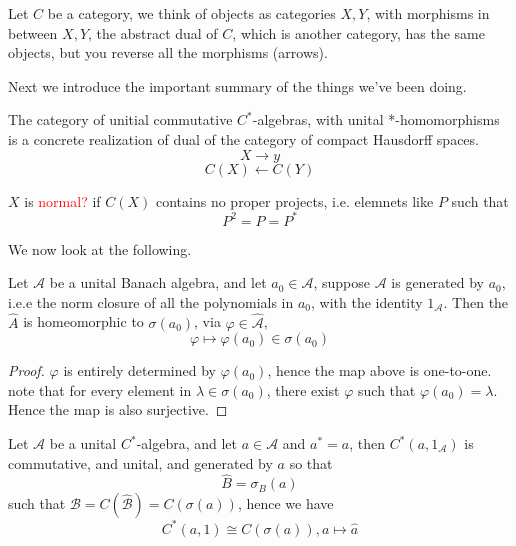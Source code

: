 \begin{definition}
    Let $C$ be a category, we think of objects as categories $X,Y$, with morphisms in between $X,Y$, the abstract dual  of $C$, which is another category, has the same objects, but you reverse all the morphisms (arrows).
\end{definition}
Next we introduce the important summary of the things we've been doing.

\begin{theorem}
    The category of unitial commutative $C^*$-algebras, with unital *-homomorphisms is a concrete realization of dual of the category of compact Hausdorff spaces.
    \begin{equation*}
        X\rightarrow y
    \end{equation*}
    \begin{equation*}
        C(X)\leftarrow C(Y)
    \end{equation*}
\end{theorem}

$X$ is \textcolor{red}{normal?} if $C(X)$ contains no proper projects, i.e. elemnets like $P$ such that
\begin{equation*}
    P^2=P=P^*
\end{equation*}

We now look at the following.
\begin{proposition}
    Let $\mathcal{A}$ be a unital Banach algebra, and let $a_0\in\mathcal{A}$, suppose $\mathcal{A}$ is generated by $a_0$, i.e.e the norm closure of all the polynomials in $a_0$, with the identity $1_\mathcal{A}$. Then the $\widehat{A}$ is homeomorphic to $\sigma(a_0)$, via $\varphi\in\widehat{\mathcal{A}}$, 
    \begin{equation*}
        \varphi\mapsto \varphi(a_0)\in\sigma(a_0)
    \end{equation*}
\end{proposition}
\begin{proof}
    $\varphi$ is entirely determined by $\varphi(a_0)$, hence the map above is one-to-one. note that for every element in $\lambda\in\sigma(a_0)$, there exist $\varphi$ such that $\varphi(a_0)=\lambda$. Hence the map is also surjective.
\end{proof}

Let $\mathcal{A}$ be a unital $C^*$-algebra, and let $a\in\mathcal{A}$ and $a^*=a$, then $C^*(a,1_\mathcal{A})$ is commutative, and unital, and generated by $a$ so that
\begin{equation*}
    \widehat{B}=\sigma_B(a)
\end{equation*}
such that $\mathcal{B}=C(\widehat{\mathcal{B}})=C(\sigma(a))$, hence we have
\begin{equation*}
    C^*(a,1)\cong C(\sigma(a)), a\mapsto \widehat{a}
\end{equation*}

